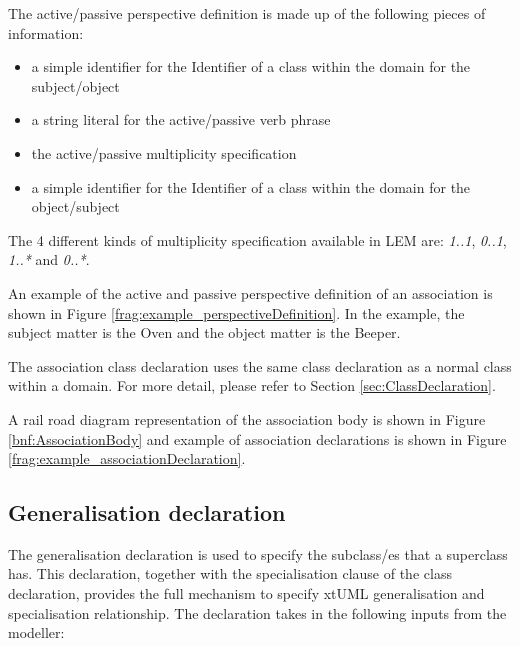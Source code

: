 The active/passive perspective definition is made up of the following pieces of information:
\begin{itemize}
\item a simple identifier for the Identifier of a class within the domain for the subject/object
\item a string literal for the active/passive verb phrase
\item the active/passive multiplicity specification
\item a simple identifier for the Identifier of a class within the domain for the object/subject
\end{itemize}

The 4 different kinds of multiplicity specification available in LEM are: \textit{1..1}, \textit{0..1}, \textit{1..*} and \textit{0..*}. 

An example of the active and passive perspective definition of an association is shown in Figure \ref{frag:example_perspectiveDefinition}. In the example, the subject matter is the Oven and the object matter is the Beeper.


The association class declaration uses the same class declaration as a normal class within a domain. For more detail, please refer to Section \ref{sec:ClassDeclaration}. 

A rail road diagram representation of the association body is shown in Figure \ref{bnf:AssociationBody} and example of association declarations is shown in Figure \ref{frag:example_associationDeclaration}.



\subsection{Generalisation declaration}
The generalisation declaration is used to specify the subclass/es that a superclass has. This declaration, together with the specialisation clause of the class declaration, provides the full mechanism to specify xtUML generalisation and specialisation relationship. The declaration takes in the following inputs from the modeller:

